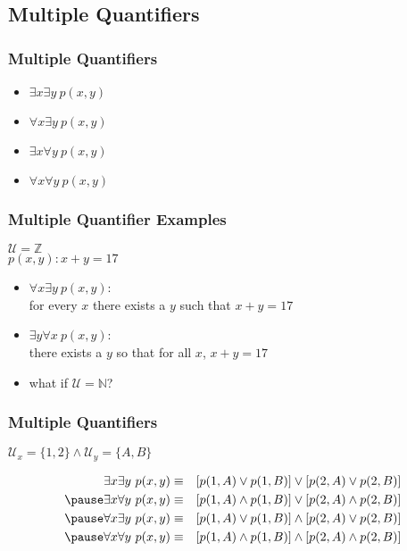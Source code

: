 \documentclass[dvipsnames]{beamer}
\begin{document}
\subsection{Multiple Quantifiers}

\begin{frame}
  \frametitle{Multiple Quantifiers}

  \begin{itemize}
    \item $\exists x \exists y~p(x,y)$
    \item $\forall x \exists y~p(x,y)$
    \item $\exists x \forall y~p(x,y)$
    \item $\forall x \forall y~p(x,y)$
  \end{itemize}
\end{frame}

\begin{frame}
  \frametitle{Multiple Quantifier Examples}

  \begin{example}
    $\mathcal{U}=\mathbb{Z}$\\
    $p(x,y): x+y=17$

    \begin{itemize}
      \pause
      \item $\forall x \exists y~p(x,y)$:\\
        for every $x$ there exists a $y$ such that $x+y=17$

      \pause
      \item $\exists y \forall x~p(x,y)$:\\
        there exists a $y$ so that for all $x$,  $x+y=17$

      \pause
      \bigskip
      \item what if $\mathcal{U}=\mathbb{N}$?
    \end{itemize}
  \end{example}
\end{frame}

\begin{frame}
  \frametitle{Multiple Quantifiers}

  \begin{example}
    $\mathcal{U}_x = \{1,2\} \wedge \mathcal{U}_y = \{A,B\}$

    \pause
    \begin{eqnarray*}
      \exists x \exists y~p(x,y) & \equiv & [p(1,A) \vee p(1,B)]
                                       \vee [p(2,A) \vee p(2,B)]\\\pause
      \exists x \forall y~p(x,y) & \equiv & [p(1,A) \wedge p(1,B)]
                                       \vee [p(2,A) \wedge p(2,B)]\\\pause
      \forall x \exists y~p(x,y) & \equiv & [p(1,A) \vee p(1,B)]
                                     \wedge [p(2,A) \vee p(2,B)]\\\pause
      \forall x \forall y~p(x,y) & \equiv & [p(1,A) \wedge p(1,B)]
                                     \wedge [p(2,A) \wedge p(2,B)]
    \end{eqnarray*}
  \end{example}
\end{frame}
\end{document}
